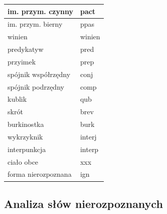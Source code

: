 \begin{table}[ht!]
\begin{tabular}{|l|l|}
im. przym. czynny        & pact           \\ \hline
im. przym. bierny        & ppas           \\ \hline
winien                   & winien         \\ \hline
predykatyw               & pred           \\ \hline
przyimek                 & prep           \\ \hline
spójnik współrzędny      & conj           \\ \hline
spójnik podrzędny        & comp           \\ \hline
kublik                   & qub            \\ \hline
skrót                    & brev           \\ \hline
burkinostka              & burk           \\ \hline
wykrzyknik               & interj         \\ \hline
interpunkcja             & interp         \\ \hline
ciało obce               & xxx            \\ \hline
forma nierozpoznana      & ign            \\ \hline
\end{tabular}
\end{table}

\clearpage
\subsection{Analiza słów nierozpoznanych}

